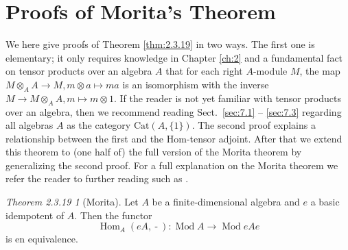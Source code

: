 \documentclass{surv-l}
\numberwithin{equation}{chapter}
\numberwithin{figure}{chapter}
\theoremstyle{plain}
\theoremstyle{definition}
\theoremstyle{remark}
\DeclareMathOperator{\Hom}{Hom}
\DeclareMathOperator{\Mod}{Mod}
\DeclareMathOperator{\blank}{-}
\begin{document}
\section{Proofs of Morita's Theorem}\label{app:b.4}
\label{sec:hm19}
We here give proofs of Theorem \ref{thm:2.3.19} in two ways.
The first one is elementary; it only requires knowledge in Chapter \ref{ch:2} and
a fundamental fact on tensor products over an algebra $A$ that
for each right $A$-module $M$, the map $M \otimes_A A \to M, m\otimes a \mapsto ma$
is an isomorphism with the inverse $M \to M \otimes_A A, m \mapsto m \otimes 1$.
If the reader is not yet familiar with tensor products over an algebra, then
we recommend reading Sect.\ \ref{sec:7.1} -- \ref{sec:7.3} regarding all algebras $A$ as the category $\mathrm{Cat}(A, \{1\})$.
The second proof explains a relationship between the first and the Hom-tensor adjoint.
After that we extend this theorem to (one half of) the full version of the Morita theorem
by generalizing the second proof.
For a full explanation on the Morita theorem
we refer the reader to further reading such as \cite[\S 22]{GTM13}.

\newtheorem*{thm19}{Theorem 2.3.19}
\begin{thm19}[Morita]
Let $A$ be a finite-dimensional algebra and
$e$ a basic idempotent of $A$.
Then the functor
\[
\Hom_A(eA, \blank) \colon \Mod A \to \Mod eAe
\]
is en equivalence.
\end{thm19}
\end{document}
